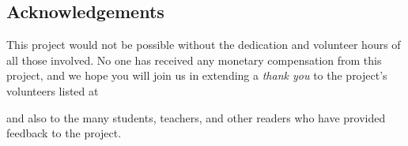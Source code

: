 \subsection*{Acknowledgements}

This project would not be possible without the dedication and volunteer hours of all those involved. No one has received any monetary compensation from this project, and we hope you will join us in extending a \emph{thank you} to the project's volunteers listed at
\begin{center}
\end{center}
and also to the many students, teachers, and other readers who have provided feedback to the project.

